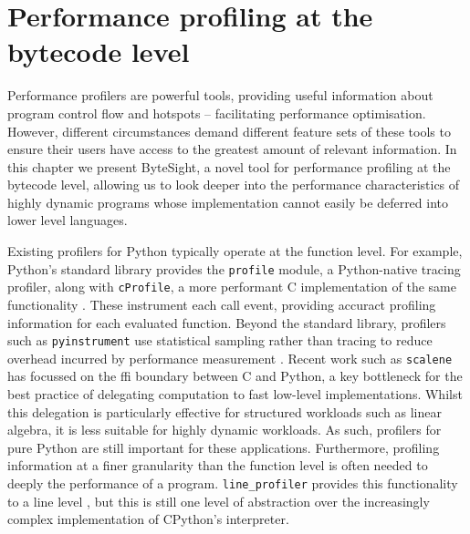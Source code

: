 \chapter{Performance profiling at the bytecode level} %
\label{chap:profiling-bytecode}

Performance profilers are powerful tools, providing useful information about program control flow and hotspots -- facilitating performance optimisation.
However, different circumstances demand different feature sets of these tools to ensure their users have access to the greatest amount of relevant information.
In this chapter we present ByteSight, a novel tool for performance profiling at the bytecode level, allowing us to look deeper into the performance characteristics of highly dynamic programs whose implementation cannot easily be deferred into lower level languages.


Existing profilers for Python typically operate at the function level.
For example, Python's standard library provides the \texttt{profile} module, a Python-native tracing profiler, along with \texttt{cProfile}, a more performant C implementation of the same functionality \cite{pythonsoftwarefoundationPythonProfilers}. These instrument each call event, providing accuract profiling information for each evaluated function.
Beyond the standard library, profilers such as \texttt{pyinstrument} use statistical sampling rather than tracing to reduce overhead incurred by performance measurement \cite{rickerbyPyinstrument2025}.
Recent work such as \texttt{scalene} \cite{bergerTriangulatingPythonPerformance2023a} has focussed on the \ac{ffi} boundary between C and Python, a key bottleneck for the best practice of delegating computation to fast low-level implementations.
Whilst this delegation is particularly effective for structured workloads such as linear algebra, it is less suitable for highly dynamic workloads. %
As such, profilers for pure Python are still important for these applications.
Furthermore, profiling information at a finer granularity than the function level is often needed to deeply the performance of a program.
\texttt{line\_profiler} provides this functionality to a line level \cite{robertkernPyutilsLine_profiler2025}, but this is still one level of abstraction over the increasingly complex implementation of CPython's interpreter.

